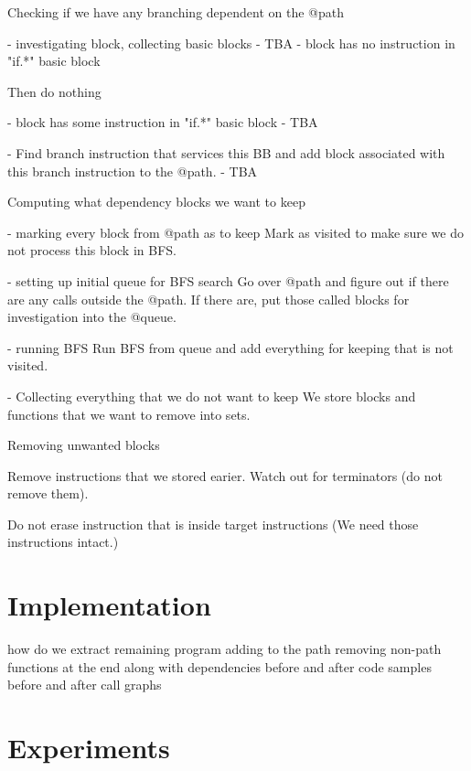 \documentclass[12pt, twoside]{fithesis2}
\renewcommand{\_}{\leavevmode \kern0.07em\vbox{\hrule width0.4em}}
\begin{document}
Checking if we have any branching dependent on the @path

- investigating block, collecting basic blocks
 - TBA
- block has no instruction in "if.*" basic block

Then do nothing

- block has some instruction in "if.*" basic block
 - TBA

- Find branch instruction that services this BB and add block associated with this branch instruction to the @path.
 - TBA

Computing what dependency blocks we want to keep

- marking every block from @path as to keep
Mark as visited to make sure we do not process this block in BFS.

- setting up initial queue for BFS search
Go over @path and figure out if there are any calls outside the @path. If there
are, put those called blocks for investigation into the @queue.

- running BFS
Run BFS from queue and add everything for keeping that is not visited.

- Collecting everything that we do not want to keep
We store blocks and functions that we want to remove into sets.

Removing unwanted blocks

Remove instructions that we stored earier. Watch out for terminators (do not
remove them).

Do not erase instruction that is inside target instructions (We need those
instructions intact.)

\chapter{Implementation}
\label{chap:implementation}

\cite{llvm-writing-pass}
how do we extract remaining program
adding to the path
removing non-path functions at the end
along with dependencies
before and after code samples
before and after call graphs

\chapter{Experiments}
\label{chap:experiments}


\end{document}
